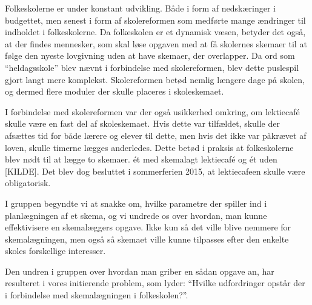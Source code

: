 Folkeskolerne er under konstant udvikling. Både i form af nedskæringer i budgettet, men senest i form af skolereformen som medførte mange ændringer til indholdet i folkeskolerne. Da folkeskolen er et dynamisk væsen, betyder det også, at der findes mennesker, som skal løse opgaven med at få skolernes skemaer til at følge den nyeste lovgivning uden at have skemaer, der overlapper. Da ord som ``heldagsskole'' blev nævnt i forbindelse med skolereformen, blev dette puslespil gjort langt mere komplekst. Skolereformen betød nemlig længere dage på skolen, og dermed flere moduler der skulle placeres i skoleskemaet.

I forbindelse med skolereformen var der også usikkerhed omkring, om lektiecaf\'e skulle være en fast del af skoleskemaet. Hvis dette var tilfældet, skulle der afsættes tid for både lærere og elever til dette, men hvis det ikke var påkrævet af loven, skulle timerne lægges anderledes. Dette betød i praksis at folkeskolerne blev nødt til at lægge to skemaer. ét med skemalagt lektiecaf\'e og ét uden [KILDE]. Det blev dog besluttet i sommerferien 2015, at lektiecafeen skulle være obligatorisk\cite{Lektiecafe}.

I gruppen begyndte vi at snakke om, hvilke parametre der spiller ind i planlægningen af et skema, og vi undrede os over hvordan, man kunne effektivisere en skemalæggers opgave. Ikke kun så det ville blive nemmere for skemalægningen, men også så skemaet ville kunne tilpasses efter den enkelte skoles forskellige interesser.

Den undren i gruppen over hvordan man griber en sådan opgave an, har resulteret i vores initierende problem, som lyder: ``Hvilke udfordringer opstår der i forbindelse med skemalægningen i folkeskolen?''.

